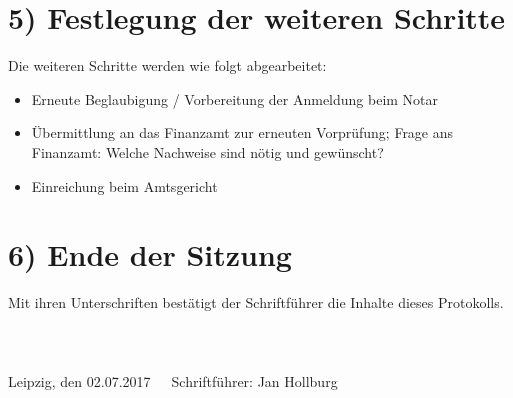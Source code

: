 \documentclass[10pt,a4paper]{scrartcl}
\newcommand{\eventdate}{02.07.2017}
\newcommand{\schriftfuehrer}{Jan Hollburg}
\begin{document}
\section*{5) Festlegung der weiteren Schritte}
    Die weiteren Schritte werden wie folgt abgearbeitet:
    \begin{itemize}
        \item Erneute Beglaubigung / Vorbereitung der Anmeldung beim Notar
		\item {\"U}bermittlung an das Finanzamt zur erneuten Vorpr{\"u}fung; Frage ans Finanzamt: Welche Nachweise sind n{\"o}tig und gew{\"u}nscht?
		\item Einreichung beim Amtsgericht
    \end{itemize}

\section*{6) Ende der Sitzung}
    Mit ihren Unterschriften best{\"a}tigt der Schriftf{\"u}hrer die Inhalte dieses Protokolls.
\\
\\
\\
\\
Leipzig, den \eventdate \ \ \ Schriftf{\"u}hrer: \schriftfuehrer
\end{document}
